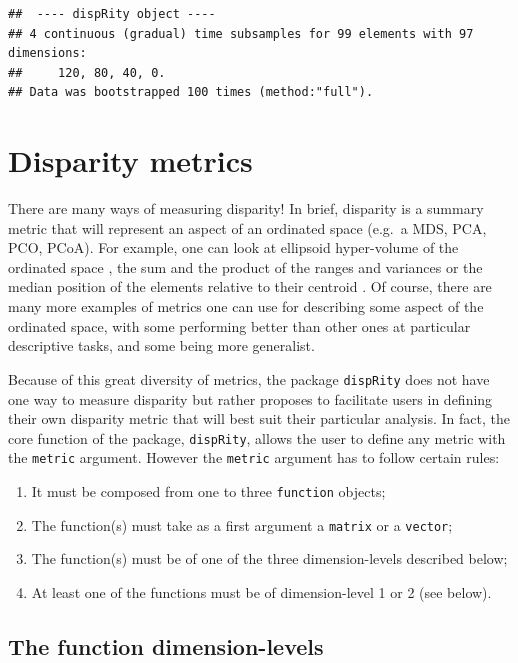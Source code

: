 \documentclass[]{book}
\providecommand{\tightlist}{%
  \setlength{\itemsep}{0pt}\setlength{\parskip}{0pt}}
\theoremstyle{definition}
\theoremstyle{definition}
\theoremstyle{remark}
\begin{document}
\begin{verbatim}
##  ---- dispRity object ---- 
## 4 continuous (gradual) time subsamples for 99 elements with 97 dimensions:
##     120, 80, 40, 0.
## Data was bootstrapped 100 times (method:"full").
\end{verbatim}

\hypertarget{disparity-metrics}{\section{Disparity
metrics}\label{disparity-metrics}}

There are many ways of measuring disparity! In brief, disparity is a
summary metric that will represent an aspect of an ordinated space
(e.g.~a MDS, PCA, PCO, PCoA). For example, one can look at ellipsoid
hyper-volume of the ordinated space \citet{DonohueDim}, the sum and the
product of the ranges and variances \citet{Wills1994} or the median
position of the elements relative to their centroid \citet{Wills1994}.
Of course, there are many more examples of metrics one can use for
describing some aspect of the ordinated space, with some performing
better than other ones at particular descriptive tasks, and some being
more generalist.

Because of this great diversity of metrics, the package
\texttt{dispRity} does not have one way to measure disparity but rather
proposes to facilitate users in defining their own disparity metric that
will best suit their particular analysis. In fact, the core function of
the package, \texttt{dispRity}, allows the user to define any metric
with the \texttt{metric} argument. However the \texttt{metric} argument
has to follow certain rules:

\begin{enumerate}
\def\labelenumi{\arabic{enumi}.}
\tightlist
\item
  It must be composed from one to three \texttt{function} objects;
\item
  The function(s) must take as a first argument a \texttt{matrix} or a
  \texttt{vector};
\item
  The function(s) must be of one of the three dimension-levels described
  below;
\item
  At least one of the functions must be of dimension-level 1 or 2 (see
  below).
\end{enumerate}

\subsection{The function
dimension-levels}\label{the-function-dimension-levels}
\end{document}
